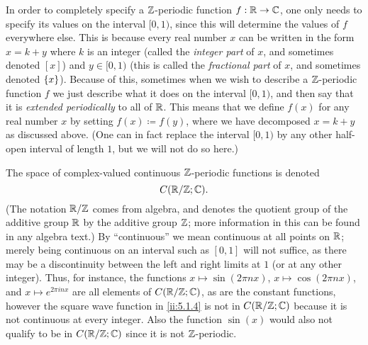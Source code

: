 \begin{note}
  In order to completely specify a \(\mathbb{Z}\)-periodic function \(f : \mathbb{R} \to \mathbb{C}\), one only needs to specify its values on the interval \([0, 1)\), since this will determine the values of \(f\) everywhere else.
  This is because every real number \(x\) can be written in the form \(x = k + y\) where \(k\) is an integer (called the \emph{integer part} of \(x\), and sometimes denoted \([x]\)) and \(y \in [0, 1)\) (this is called the \emph{fractional part} of \(x\), and sometimes denoted \(\left\lbrace x\right\rbrace\)).
  Because of this, sometimes when we wish to describe a \(\mathbb{Z}\)-periodic function \(f\) we just describe what it does on the interval \([0, 1)\), and then say that it is \emph{extended periodically} to all of \(\mathbb{R}\).
  This means that we define \(f(x)\) for any real number \(x\) by setting \(f(x) \coloneqq f(y)\), where we have decomposed \(x = k + y\) as discussed above.
  (One can in fact replace the interval \([0, 1)\) by any other half-open interval of length \(1\), but we will not do so here.)
\end{note}

\begin{note}
  The space of complex-valued continuous \(\mathbb{Z}\)-periodic functions is denoted
  \[
    C(\mathbb{R} / \mathbb{Z} ; \mathbb{C}).
  \]
  (The notation \(\mathbb{R} / \mathbb{Z}\) comes from algebra, and denotes the quotient group of the additive group \(\mathbb{R}\) by the additive group \(\mathbb{Z}\);
  more information in this can be found in any algebra text.)
  By ``continuous'' we mean continuous at all points on \(\mathbb{R}\);
  merely being continuous on an interval such as \([0, 1]\) will not suffice, as there may be a discontinuity between the left and right limits at \(1\) (or at any other integer).
  Thus, for instance, the functions \(x \mapsto \sin(2 \pi n x)\), \(x \mapsto \cos(2 \pi n x)\), and \(x \mapsto e^{2 \pi i n x}\) are all elements of \(C(\mathbb{R} / \mathbb{Z} ; \mathbb{C})\), as are the constant functions, however the square wave function in \cref{ii:5.1.4} is not in \(C(\mathbb{R} / \mathbb{Z} ; \mathbb{C})\) because it is not continuous at every integer.
  Also the function \(\sin(x)\) would also not qualify to be in \(C(\mathbb{R} / \mathbb{Z} ; \mathbb{C})\) since it is not \(\mathbb{Z}\)-periodic.
\end{note}

